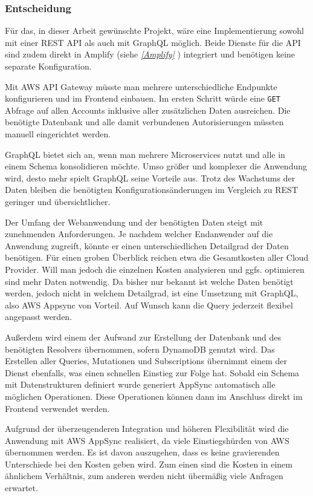 \clearpage
\subsubsection{Entscheidung}
Für das, in dieser Arbeit gewünschte Projekt, wäre eine Implementierung sowohl mit einer REST API als auch mit GraphQL möglich.
Beide Dienste für die API sind zudem direkt in Amplify (siehe \textit{\ref{Amplify} }) integriert und benötigen keine separate Konfiguration.

Mit AWS API Gateway müsste man mehrere unterschiedliche Endpunkte konfigurieren und im Frontend einbauen.
Im ersten Schritt würde eine \verb+GET+ Abfrage auf allen Accounts inklusive aller zusätzlichen Daten ausreichen.
Die benötigte Datenbank und alle damit verbundenen Autorisierungen müssten manuell eingerichtet werden.

GraphQL bietet sich an, wenn man mehrere Microservices nutzt und alle in einem Schema konsolidieren möchte.
Umso größer und komplexer die Anwendung wird, desto mehr spielt GraphQL seine Vorteile aus.
Trotz des Wachstums der Daten bleiben die benötigten Konfigurationsänderungen im Vergleich zu REST geringer und übersichtlicher.

Der Umfang der Webanwendung und der benötigten Daten steigt mit zunehmenden Anforderungen.
Je nachdem welcher Endanwender auf die Anwendung zugreift, könnte er einen unterschiedlichen Detailgrad der Daten benötigen.
Für einen groben Überblick reichen etwa die Gesamtkosten aller Cloud Provider.
Will man jedoch die einzelnen Kosten analysieren und ggfs. optimieren sind mehr Daten notwendig.
Da bisher nur bekannt ist welche Daten benötigt werden, jedoch nicht in welchem Detailgrad, ist eine Umsetzung mit GraphQL, also AWS Appsync von Vorteil.
Auf Wunsch kann die Query jederzeit flexibel angepasst werden.

Außerdem wird einem der Aufwand zur Erstellung der Datenbank und des benötigten Resolvers übernommen, sofern DynamoDB genutzt wird.
Das Erstellen aller Queries, Mutationen und Subscriptions übernimmt einem der Dienst ebenfalls, was einen schnellen Einstieg zur Folge hat.
Sobald ein Schema mit Datenstrukturen definiert wurde generiert AppSync automatisch alle möglichen Operationen.
Diese Operationen können dann im Anschluss direkt im Frontend verwendet werden.

Aufgrund der überzeugenderen Integration und höheren Flexibilität wird die Anwendung mit AWS AppSync realisiert, da viele Einstiegshürden von AWS übernommen werden.
Es ist davon auszugehen, dass es keine gravierenden Unterschiede bei den Kosten geben wird.
Zum einen sind die Kosten in einem ähnlichem Verhältnis, zum anderen werden nicht übermäßig viele Anfragen erwartet.





